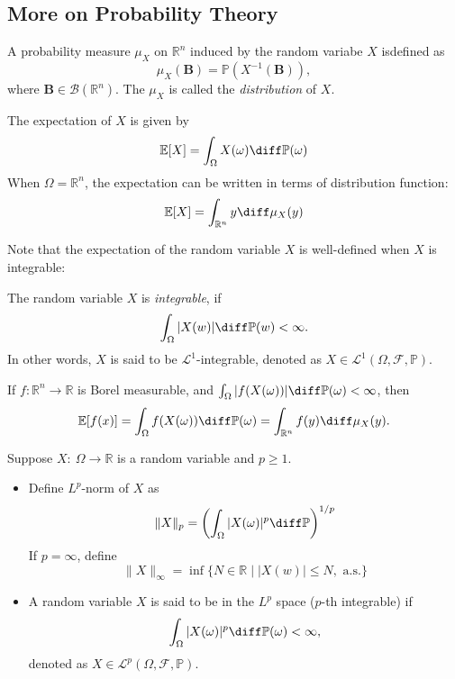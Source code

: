 \subsection{More on Probability Theory}
\begin{definition}[Distribution]
A probability measure $\mu_X$ on $\mathbb{R}^n$ induced by the random variabe $X$ isdefined as
\[
\mu_X(\bm B)=\mathbb{P}(X^{-1}(\bm B)),
\]
where $\bm B\in\mathcal{B}(\mathbb{R}^n)$. The $\mu_X$ is called the \emph{distribution} of $X$.
\end{definition}

\begin{definition}[Expectation]
The expectation of $X$ is given by
\[
\mathbb{E}[X] = \int_{\Omega}X(\omega)\diff \mathbb{P}(\omega)
\]
When $\Omega=\mathbb{R}^n$, the expectation can be written in terms of distribution function:
\[
\mathbb{E}[X] = \int_{\mathbb{R}^n}y\diff\mu_X(y)
\]
\end{definition}
Note that the expectation of the random variable $X$ is well-defined when $X$ is integrable:

\begin{definition}[Integrable]
The random variable $X$ is \emph{integrable}, if
\[
\int_\Omega|X(w)|\diff\mathbb{P}(w)<\infty.
\]
In other words, $X$ is said to be $\mathcal{L}^1$-integrable, denoted as $X\in\mathcal{L}^1(\Omega,\mathcal{F},\mathbb{P})$.
\end{definition}

\begin{example}
If $f:\mathbb{R}^n\to\mathbb{R}$ is Borel measurable, 
and $\int_{\Omega}|f(X(\omega))|\diff\mathbb{P}(\omega)<\infty$, then
\[
\mathbb{E}[f(x)] = \int_{\Omega}f(X(\omega))\diff\mathbb{P}(\omega)
=
\int_{\mathbb{R}^n}f(y)\diff\mu_X(y).
\]
\end{example}

\begin{definition}[$L^p$ space]
Suppose $X:~\Omega\to\mathbb{R}$ is a random variable and $p\ge1$.
\begin{itemize}
\item
Define $L^p$-norm of $X$ as
\[
\|X\|_p=\left(\int_\Omega|X(\omega)|^p\diff\mathbb{P}\right)^{1/p}
\]
If $p=\infty$, define
\[
\|X\|_\infty=\inf\{N\in\mathbb{R}\mid|X(w)|\le N,\text{ a.s.}\}
\]
\item
A random variable $X$ is said to be in the $L^p$ space ($p$-th integrable) if
\[
\int_\Omega|X(\omega)|^p\diff\mathbb{P}(\omega)<\infty,
\]
denoted as $X\in\mathcal{L}^p(\Omega,\mathcal{F},\mathbb{P})$.
\end{itemize}
\end{definition}


